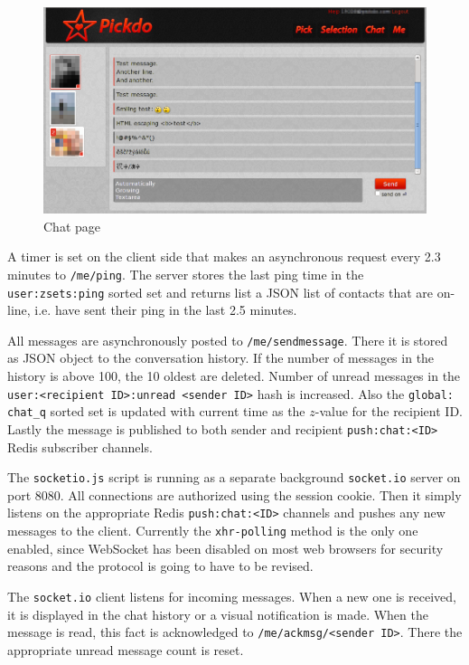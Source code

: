 \documentclass[12pt,oneside]{fithesis}
\begin{document}
		\label{section:chat}
		\begin{figure}[h]
	  \centering
	    \includegraphics[width=1.0\textwidth]{screen-chat.png}
		  \caption{Chat page}
		  \label{fig:screen-chat}
	  \end{figure}
	  
	  A timer is set on the client side that makes an asynchronous request every 2.3 minutes to \texttt{/me/ping}. The server stores the last ping time in the \texttt{user:zsets:ping} sorted set and returns list a JSON list of contacts that are on-line, i.e. have sent their ping in the last 2.5 minutes.
	  
	  All messages are asynchronously posted to \texttt{/me/sendmessage}. There it is stored as JSON object to the conversation history. If the number of messages in the history is above 100, the 10 oldest are deleted. Number of unread messages in the \texttt{user:<recipient ID>:unread <sender ID>} hash is increased. Also the \texttt{global: chat\_q} sorted set is updated with current time as the $z$-value for the recipient ID. Lastly the message is published to both sender and recipient \texttt{push:chat:<ID>} Redis subscriber channels.
	  
	  The \texttt{socketio.js} script is running as a separate background \texttt{socket.io} server on port 8080. All connections are authorized using the session cookie. Then it simply listens on the appropriate Redis \texttt{push:chat:<ID>} channels and pushes any new messages to the client. Currently the \texttt{xhr-polling} method is the only one enabled, since WebSocket has been disabled on most web browsers for security reasons and the protocol is going to have to be revised.
	  
	  The \texttt{socket.io} client listens for incoming messages. When a new one is received, it is displayed in the chat history or a visual notification is made. When the message is read, this fact is acknowledged to \texttt{/me/ackmsg/<sender ID>}. There the appropriate unread message count is reset.
	  
\end{document}
